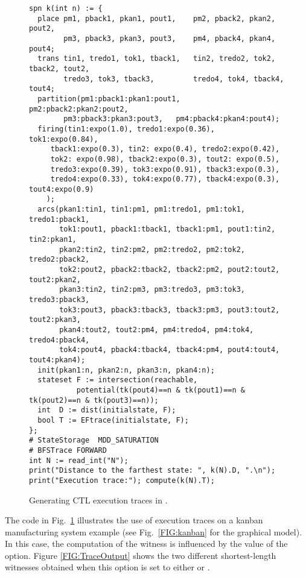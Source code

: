 \begin{developer}


\begin{figure}
\begin{lstlisting}
spn k(int n) := {
  place pm1, pback1, pkan1, pout1,    pm2, pback2, pkan2, pout2,
        pm3, pback3, pkan3, pout3,    pm4, pback4, pkan4, pout4;
  trans tin1, tredo1, tok1, tback1,   tin2, tredo2, tok2, tback2, tout2,
        tredo3, tok3, tback3,         tredo4, tok4, tback4, tout4;
  partition(pm1:pback1:pkan1:pout1,   pm2:pback2:pkan2:pout2, 
	    pm3:pback3:pkan3:pout3,   pm4:pback4:pkan4:pout4);
  firing(tin1:expo(1.0), tredo1:expo(0.36), tok1:expo(0.84), 
	 tback1:expo(0.3), tin2: expo(0.4), tredo2:expo(0.42), 
	 tok2: expo(0.98), tback2:expo(0.3), tout2: expo(0.5), 
	 tredo3:expo(0.39), tok3:expo(0.91), tback3:expo(0.3), 
	 tredo4:expo(0.33), tok4:expo(0.77), tback4:expo(0.3), tout4:expo(0.9)
	); 
  arcs(pkan1:tin1, tin1:pm1, pm1:tredo1, pm1:tok1, tredo1:pback1,
       tok1:pout1, pback1:tback1, tback1:pm1, pout1:tin2, tin2:pkan1,
       pkan2:tin2, tin2:pm2, pm2:tredo2, pm2:tok2, tredo2:pback2,
       tok2:pout2, pback2:tback2, tback2:pm2, pout2:tout2, tout2:pkan2,
       pkan3:tin2, tin2:pm3, pm3:tredo3, pm3:tok3, tredo3:pback3,
       tok3:pout3, pback3:tback3, tback3:pm3, pout3:tout2, tout2:pkan3,
       pkan4:tout2, tout2:pm4, pm4:tredo4, pm4:tok4, tredo4:pback4,
       tok4:pout4, pback4:tback4, tback4:pm4, pout4:tout4, tout4:pkan4);
  init(pkan1:n, pkan2:n, pkan3:n, pkan4:n); 
  stateset F := intersection(reachable,
           potential(tk(pout4)==n & tk(pout1)==n & tk(pout2)==n & tk(pout3)==n));
  int  D := dist(initialstate, F);
  bool T := EFtrace(initialstate, F);
};
# StateStorage  MDD_SATURATION
# BFSTrace FORWARD
int N := read_int("N");
print("Distance to the farthest state: ", k(N).D, ".\n");
print("Execution trace:"); compute(k(N).T);
\end{lstlisting}
\caption{Generating CTL execution traces in {\smart}.}
\label{FIG:KanbanTraces}
\end{figure}


The code in Fig.~\ref{FIG:KanbanTraces} illustrates the use of execution
traces on a kanban manufacturing system example (see Fig.~\ref{FIG:kanban}
for the graphical model).
In this case, the computation of the witness is influenced by the value of the
 option.
Figure \ref{FIG:TraceOutput} shows the two different shortest-length witnesses
obtained when this option is set to either  or .


\end{developer}
